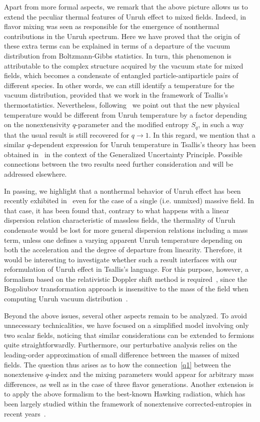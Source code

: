 \documentclass[floats,prd,aps,amssymb,nofootinbib,showkeys]{revtex4}
\begin{document}
Apart from more formal aspects, we remark that the above picture 
allows us to extend the peculiar 
thermal features of Unruh effect
to mixed fields. Indeed, in~\cite{Luciano,NonTN}
flavor mixing was seen as responsible 
for the emergence of nonthermal contributions in the
Unruh spectrum. Here we have proved that
the origin of these extra terms can be 
explained in terms of a departure of the vacuum 
distribution from Boltzmann-Gibbs
statistics. In turn, this phenomenon is attributable
to  the complex structure acquired by the
vacuum state for mixed fields, which becomes
a condensate of entangled particle-antiparticle pairs
of different species. In other words, we can still identify a temperature 
for the vacuum distribution, provided 
that we work in the framework of Tsallis's thermostatistics.
Nevertheless, following~\cite{AbePla} 
we point out that the new physical temperature
would be different from Unruh temperature by a factor
depending on the nonextensivity $q$-parameter
and the modified entropy $S_q$, in such a way 
that the usual result is still recovered for $q\rightarrow1$.
In this regard, we mention that a similar $q$-dependent
expression for Unruh temperature in Tsallis's theory
has been obtained in~\cite{Shababi} in the context of the Generalized Uncertainty Principle. Possible connections between
the two results need further consideration and
will be addressed elsewhere. 

In passing, we highlight 
that a nonthermal behavior of Unruh effect has been
recently exhibited in~\cite{Dop} even for
the case of a single (i.e. unmixed) massive
field. In that case, it has been found that, 
contrary to what happens with a linear dispersion relation 
characteristic of massless fields, the thermality of Unruh
condensate would be lost for more general 
dispersion relations including a mass term, 
unless one defines  a varying apparent Unruh temperature depending on both the acceleration and the degree of departure from linearity. 
Therefore, it would be interesting to investigate
whether such a result interfaces with 
our reformulation of Unruh effect in Tsallis's
language. For this purpose, however, 
a formalism based on the relativistic Doppler shift
method is required~\cite{Dop}, since the Bogoliubov transformation approach is insensitive to 
the mass of the field when computing 
Unruh vacuum distribution~\cite{Takagi}.

Beyond the above issues, several other aspects
remain to be analyzed. To avoid unnecessary technicalities, 
we have focused on a simplified model involving only two scalar
fields, noticing that similar considerations can be extended
to fermions quite straightforwardly.
Furthermore, our perturbative 
analysis relies on the leading-order approximation of 
small difference between the masses of mixed fields. 
The question thus arises as to how the connection~\eqref{q1}
between the nonextensive $q$-index and the mixing
parameters would appear for arbitrary mass differences,
as well as in the case of three flavor generations. 
Another extension is to apply the
above formalism to the best-known
Hawking radiation, which has
been largely studied within the framework of 
nonextensive corrected-entropies
in recent years~\cite{Barrow}. 
\end{document}
